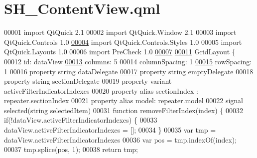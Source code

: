 \hypertarget{SH__ContentView_8qml}{\section{S\-H\-\_\-\-Content\-View.\-qml}
\label{SH__ContentView_8qml}
}

\begin{DoxyCode}
00001 \textcolor{keyword}{import} QtQuick 2.1
00002 import QtQuick.Window 2.1
00003 import QtQuick.Controls 1.0
\hypertarget{SH__ContentView_8qml_source_l00004}{}\hyperlink{classSH__ContentView}{00004} import QtQuick.Controls.Styles 1.0
00005 import QtQuick.Layouts 1.0
00006 import PreCheck 1.0
\hypertarget{SH__ContentView_8qml_source_l00007}{}\hyperlink{classSH__ContentView_a4587c7cc61cefdb55d96e2f3b05e02b4}{00007} 
\hypertarget{SH__ContentView_8qml_source_l00011}{}\hyperlink{classSH__ContentView_a5a5fa8f42e23b857494f2c88b39d1177}{00011} GridLayout \{
00012     \textcolor{keywordtype}{id}: dataView
\hypertarget{SH__ContentView_8qml_source_l00013}{}\hyperlink{classSH__ContentView_a7ea5cf24986d3fb77ebcdfc9c3a3822a}{00013}     columns: 5
00014     columnSpacing: 1
\hypertarget{SH__ContentView_8qml_source_l00015}{}\hyperlink{classSH__ContentView_a554c2eaf9b48986c87fa8fb0178c0d1d}{00015}     rowSpacing: 1
00016     \textcolor{keyword}{property} \textcolor{keywordtype}{string} dataDelegate
\hypertarget{SH__ContentView_8qml_source_l00017}{}\hyperlink{classSH__ContentView_ace8288902fb10eb93de67293bc8ac57c}{00017}     \textcolor{keyword}{property} \textcolor{keywordtype}{string} emptyDelegate
00018     \textcolor{keyword}{property} \textcolor{keywordtype}{string} sectionDelegate
00019     \textcolor{keyword}{property} variant activeFilterIndicatorIndexes
00020     \textcolor{keyword}{property} alias sectionIndex : repeater.sectionIndex
00021     \textcolor{keyword}{property} alias model: repeater.model
00022     signal selected(\textcolor{keywordtype}{string} selectedItem)
00031     \textcolor{keyword}{function} removeFilterIndex(index) \{
00032         \textcolor{keywordflow}{if}(!dataView.activeFilterIndicatorIndexes) \{
00033             dataView.activeFilterIndicatorIndexes = [];
00034         \}
00035         var tmp = dataView.activeFilterIndicatorIndexes
00036         var pos = tmp.indexOf(index);
00037         tmp.splice(pos, 1);
00038         \textcolor{keywordflow}{return} tmp;

\end{DoxyCode}
